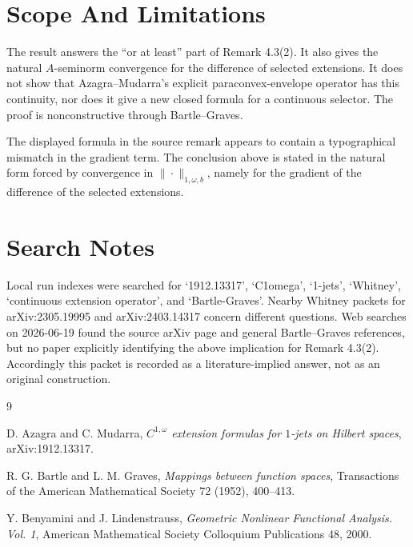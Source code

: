 \documentclass[11pt]{article}
\begin{document}
\section*{Scope And Limitations}

The result answers the ``or at least'' part of Remark 4.3(2).  It also gives
the natural \(A\)-seminorm convergence for the difference of selected
extensions.  It does not show that Azagra--Mudarra's explicit
paraconvex-envelope operator has this continuity, nor does it give a new
closed formula for a continuous selector.  The proof is nonconstructive
through Bartle--Graves.

The displayed formula in the source remark appears to contain a typographical
mismatch in the gradient term.  The conclusion above is stated in the natural
form forced by convergence in \(\|\cdot\|_{1,\omega,b}\), namely for the
gradient of the difference of the selected extensions.

\section*{Search Notes}

Local run indexes were searched for `1912.13317', `C1omega', `1-jets',
`Whitney', `continuous extension operator', and `Bartle-Graves'.  Nearby
Whitney packets for arXiv:2305.19995 and arXiv:2403.14317 concern different
questions.  Web searches on 2026-06-19 found the source arXiv page and
general Bartle--Graves references, but no paper explicitly identifying the
above implication for Remark 4.3(2).  Accordingly this packet is recorded as
a literature-implied answer, not as an original construction.

\begin{thebibliography}{9}

D. Azagra and C. Mudarra,
\emph{\(C^{1,\omega}\) extension formulas for \(1\)-jets on Hilbert spaces},
arXiv:1912.13317.

R. G. Bartle and L. M. Graves,
\emph{Mappings between function spaces},
Transactions of the American Mathematical Society 72 (1952), 400--413.

Y. Benyamini and J. Lindenstrauss,
\emph{Geometric Nonlinear Functional Analysis. Vol. 1},
American Mathematical Society Colloquium Publications 48, 2000.

\end{thebibliography}
\end{document}
